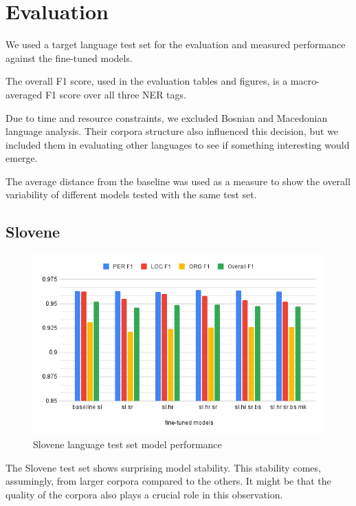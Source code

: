 \documentclass[sigconf]{acmart}
\begin{document}
\section{Evaluation}
\label{sec:evaluation}
We used a target language test set for the evaluation and measured performance against the fine-tuned models.

The overall F1 score, used in the evaluation tables and figures, is a macro-averaged F1 score over all three NER tags.

Due to time and resource constraints, we excluded Bosnian and Macedonian language analysis.
Their corpora structure also influenced this decision, but we included them in evaluating other languages to see if something interesting would emerge.

The average distance from the baseline was used as a measure to show the overall variability of different models tested with the same test set.
\subsection{Slovene}
\label{subsec:slovene}

\begin{figure}[H]
  \caption{Slovene language test set model performance}
  \label{fig:eval_sl}
  \centering
  \includegraphics[width=\linewidth]{eval_sl}
\end{figure}

The Slovene test set shows surprising model stability.
This stability comes, assumingly, from larger corpora compared to the others.
It might be that the quality of the corpora also plays a crucial role in this observation.
\end{document}
